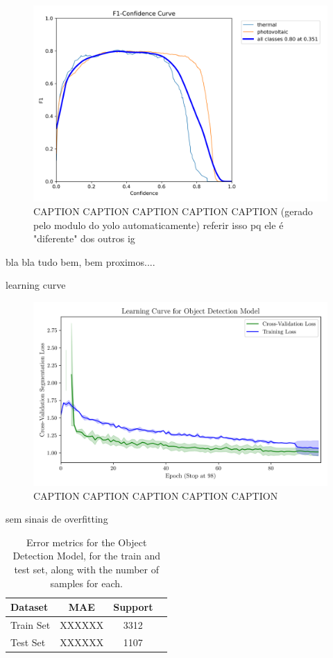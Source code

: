 \documentclass[conference]{IEEEtran}
\begin{document}
\begin{figure}[H]
    \centering
    \includegraphics[width=1\linewidth]{assets/model03_yolof1.png}
    \caption{CAPTION CAPTION CAPTION CAPTION CAPTION (gerado pelo modulo do yolo automaticamente) referir isso pq ele é "diferente" dos outros ig}
    \label{fig:model03_yolof1}
\end{figure}

bla bla tudo bem, bem proximos....

learning curve

\begin{figure}[H]
    \centering
    \includegraphics[width=1\linewidth]{assets/model03_lc.png}
    \caption{CAPTION CAPTION CAPTION CAPTION CAPTION}
    \label{fig:model03_lc}
\end{figure}

sem sinais de overfitting

\begin{table}[H]
\centering
\caption{Error metrics for the Object Detection Model, for the train and test set, along with the number of samples for each.}
\label{tab:model02_results}
\begin{tabular}{lccc}
\toprule
\textbf{Dataset} & \textbf{MAE} & \textbf{Support} \\
\midrule
Train Set & XXXXXX & 3312 \\
Test Set & XXXXXX & 1107 \\
\bottomrule
\end{tabular}
\end{table}
\end{document}
